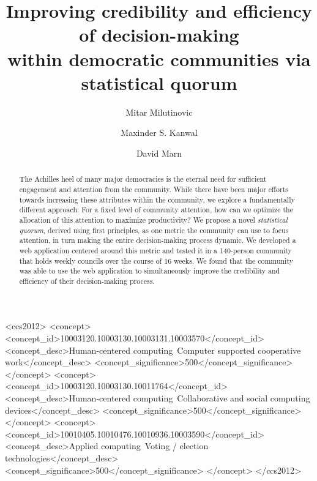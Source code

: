 \documentclass[format=acmsmall, review=true, screen=true, anonymous=true]{acmart}
\begin{document}
\title[Improving credibility and efficiency of decision-making]{Improving credibility and efficiency of decision-making \\ within democratic communities via statistical quorum}

\author{Mitar Milutinovic}
\author{Maxinder S. Kanwal}
\author{David Marn}


\begin{abstract}
The Achilles heel of many major democracies is the eternal need for sufficient engagement and attention from the community.
While there have been major efforts towards increasing these attributes within the community, we explore a fundamentally
different approach: For a fixed level of community attention, how can we optimize the allocation of this attention to
maximize productivity?
We propose a novel \emph{statistical quorum}, derived using first principles, as one metric the community can use to
focus attention, in turn making the entire decision-making process dynamic.
We developed a web application centered around this metric and tested it in a 140-person community that holds weekly
councils over the course of 16 weeks.
We found that the community was able to use the web application to simultaneously improve the credibility and efficiency
of their decision-making process.
\end{abstract}


%
%
\begin{CCSXML}
<ccs2012>
<concept>
<concept_id>10003120.10003130.10003131.10003570</concept_id>
<concept_desc>Human-centered computing~Computer supported cooperative work</concept_desc>
<concept_significance>500</concept_significance>
</concept>
<concept>
<concept_id>10003120.10003130.10011764</concept_id>
<concept_desc>Human-centered computing~Collaborative and social computing devices</concept_desc>
<concept_significance>500</concept_significance>
</concept>
<concept>
<concept_id>10010405.10010476.10010936.10003590</concept_id>
<concept_desc>Applied computing~Voting / election technologies</concept_desc>
<concept_significance>500</concept_significance>
</concept>
</ccs2012>
\end{CCSXML}
\end{document}
